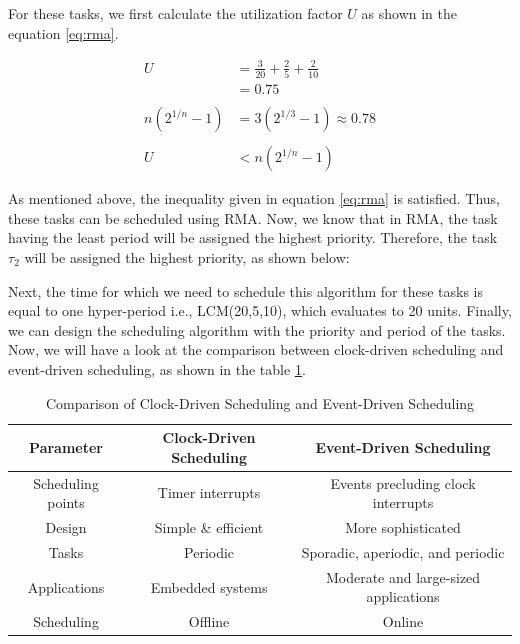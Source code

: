 \documentclass[12pt]{report}
\begin{document}
\newpage
For these tasks, we first calculate the utilization factor $U$ as shown in the equation \ref{eq:rma}. 

\begin{align*}
U &= \frac{3}{20} + \frac{2}{5} + \frac{2}{10} \\
  &= 0.75 \\~\\
n(2^{1/n} - 1) &= 3(2^{1/3} - 1) \approx 0.78 \\~\\
U &< n(2^{1/n} - 1)
\end{align*}

As mentioned above, the inequality given in equation \ref{eq:rma} is satisfied. Thus, these tasks can be scheduled using RMA. Now, we know that in RMA, the task having the least period will be assigned the highest priority. Therefore, the task $\tau_2$ will be assigned the highest priority, as shown below: 
\begin{center}
\end{center}
Next, the time for which we need to schedule this algorithm for these tasks is equal to one hyper-period i.e., LCM(20,5,10), which evaluates to 20 units. Finally, we can design the scheduling algorithm with the priority and period of the tasks. \\

Now, we will have a look at the comparison between clock-driven scheduling and event-driven scheduling, as shown in the table \ref{table:3}. 

\begin{table}[h]
\centering
\begin{tabular}{|c|c|c|}
 \hline
 \textbf{Parameter} &  \textbf{Clock-Driven Scheduling} & \textbf{Event-Driven Scheduling}\\
 \hline \hline
 Scheduling points & Timer interrupts & Events precluding clock interrupts\\ 
 \hline
 Design & Simple \& efficient & More sophisticated \\
 \hline
 Tasks & Periodic & Sporadic, aperiodic, and periodic \\
 \hline
 Applications & Embedded systems &  Moderate and
large-sized applications \\ 
 \hline
 Scheduling & Offline & Online \\
 \hline
\end{tabular}
\caption{Comparison of Clock-Driven Scheduling and Event-Driven Scheduling}
\label{table:3}
\end{table}
\end{document}
